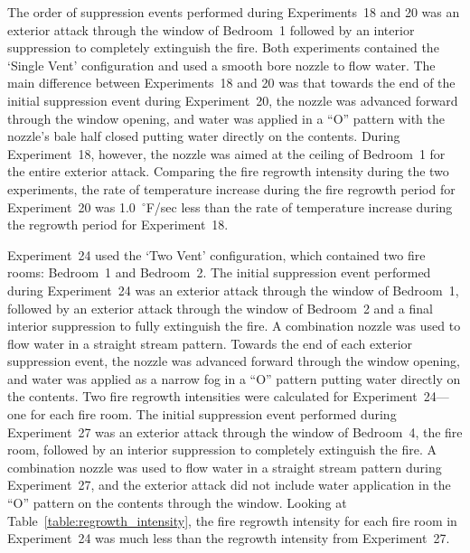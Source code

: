 \documentclass[12pt,oneside]{book}
\begin{document}
The order of suppression events performed during Experiments~18 and 20 was an exterior attack through the window of Bedroom~1 followed by an interior suppression to completely extinguish the fire. Both experiments contained the `Single Vent' configuration and used a smooth bore nozzle to flow water. The main difference between Experiments~18 and 20 was that towards the end of the initial suppression event during Experiment~20, the nozzle was advanced forward through the window opening, and water was applied in a ``O'' pattern with the nozzle's bale half closed putting water directly on the contents. During Experiment~18, however, the nozzle was aimed at the ceiling of Bedroom~1 for the entire exterior attack. Comparing the fire regrowth intensity during the two experiments, the rate of temperature increase during the fire regrowth period for Experiment~20 was 1.0~$^\circ$F/sec less than the rate of temperature increase during the regrowth period for Experiment~18.

Experiment~24 used the `Two Vent' configuration, which contained two fire rooms: Bedroom~1 and Bedroom~2. The initial suppression event performed during Experiment~24 was an exterior attack through the window of Bedroom~1, followed by an exterior attack through the window of Bedroom~2 and a final interior suppression to fully extinguish the fire. A combination nozzle was used to flow water in a straight stream pattern. Towards the end of each exterior suppression event, the nozzle was advanced forward through the window opening, and water was applied as a narrow fog in a ``O'' pattern putting water directly on the contents. Two fire regrowth intensities were calculated for Experiment~24---one for each fire room. The initial suppression event performed during Experiment~27 was an exterior attack through the window of Bedroom~4, the fire room, followed by an interior suppression to completely extinguish the fire. A combination nozzle was used to flow water in a straight stream pattern during Experiment~27, and the exterior attack did not include water application in the ``O'' pattern on the contents through the window. Looking at Table~\ref{table:regrowth_intensity}, the fire regrowth intensity for each fire room in Experiment~24 was much less than the regrowth intensity from Experiment~27.
\end{document}

